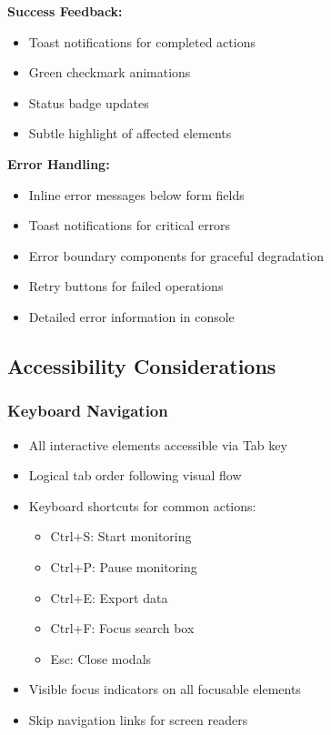 \textbf{Success Feedback:}
\begin{itemize}
    \item Toast notifications for completed actions
    \item Green checkmark animations
    \item Status badge updates
    \item Subtle highlight of affected elements
\end{itemize}

\textbf{Error Handling:}
\begin{itemize}
    \item Inline error messages below form fields
    \item Toast notifications for critical errors
    \item Error boundary components for graceful degradation
    \item Retry buttons for failed operations
    \item Detailed error information in console
\end{itemize}

\subsection{Accessibility Considerations}

\subsubsection{Keyboard Navigation}

\begin{itemize}
    \item All interactive elements accessible via Tab key
    \item Logical tab order following visual flow
    \item Keyboard shortcuts for common actions:
    \begin{itemize}
        \item Ctrl+S: Start monitoring
        \item Ctrl+P: Pause monitoring
        \item Ctrl+E: Export data
        \item Ctrl+F: Focus search box
        \item Esc: Close modals
    \end{itemize}
    \item Visible focus indicators on all focusable elements
    \item Skip navigation links for screen readers
\end{itemize}

